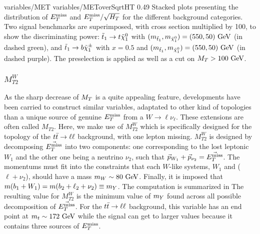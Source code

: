                         {variables/MET}
                         {variables/METoverSqrtHT}
                         {0.49}
                         {Stacked plots presenting the distribution of $E_T^\text{miss}$ and $E_T^\text{miss} /
                         \sqrt{H_T}$ for the different background categories. Two
                         signal benchmarks are superimposed, with cross section multiplied
                         by 100, to show the discriminating power:
                         $\tilde{t}_1 \rightarrow t \tilde{\chi}_1^0$ with $(m_{\tilde{t}_1},m_{\tilde{\chi}_1^0})
                         = (550,50)~\text{GeV}$ (in dashed green), and $\tilde{t}_1 \rightarrow b \tilde{\chi}_1^\pm$
                         with $x = 0.5$ and $(m_{\tilde{t}_1}, m_{\tilde{\chi}_1^0}) = (550,50)~\text{GeV}$
                         (in dashed purple). The preselection is applied as well as a cut
                         on $M_T > 100 ~\text{GeV}$.}

        \subsubsection{$M_{T2}^{W}$}

        As the sharp decrease of $M_T$ is a quite appealing feature, developments have been
        carried \cite{MT2variables} to construct similar variables, adaptated to other kind
        of topologies than
        a unique source of genuine $E_T^\text{miss}$ from a $W \rightarrow \ell \nu_\ell$.  These extensions are
        often called $M_{T2}$. Here, we make use of $M_{T2}^W$ which is specifically
        designed for the topology of the $t\bar{t} \rightarrow \ell \ell$ background, with
        one lepton missing. $M_{T2}^W$ is designed by decomposing $\vec{E_T^\text{miss}}$ into two
        components: one corresponding to the lost leptonic $W_1$ and the other one being
        a neutrino $\nu_2$, such that $\vec{p}_{W_1} + \vec{p}_{\nu_2} = \vec{E_T^\text{miss}}$.
        The momentums must fit into the constraints that each $W$-like systems, $W_1$ and
        ($\ell + \nu_2$), should have a mass $m_W \sim 80 ~\text{GeV}$. Finally, it is imposed that
        $m(b_1 + W_1) = m(b_2 + \ell_2 + \nu_2) \equiv m_{Y}$. The computation is
        summarized in 
        The resulting value for $M_{T2}^W$ is the minimum value of $m_{Y}$ found across
        all possible decomposition of $\vec{E_T^\text{miss}}$. For the $t\bar{t} \rightarrow \ell \ell$ background,
        this variable has an end point at $m_t \sim 172~\text{GeV}$ while the signal can get to
        larger values because it contains three sources of $E_T^\text{miss}$.


